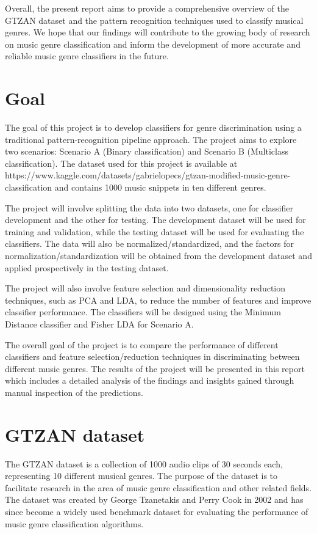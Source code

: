 \documentclass[12pt, a4paper]{article}
\begin{document}
Overall, the present report aims to provide a comprehensive overview of the GTZAN dataset and the pattern recognition techniques used to classify musical genres. We hope that our findings will contribute to the growing body of research on music genre classification and inform the development of more accurate and reliable music genre classifiers in the future.

\newpage
\section{Goal}

The goal of this project is to develop classifiers for genre discrimination using a traditional pattern-recognition pipeline approach. The project aims to explore two scenarios: Scenario A (Binary classification) and Scenario B (Multiclass classification). The dataset used for this project is available at https://www.kaggle.com/datasets/gabrielopecs/gtzan-modified-music-genre-classification and contains 1000 music snippets in ten different genres.

The project will involve splitting the data into two datasets, one for classifier development and the other for testing. The development dataset will be used for training and validation, while the testing dataset will be used for evaluating the classifiers. The data will also be normalized/standardized, and the factors for normalization/standardization will be obtained from the development dataset and applied prospectively in the testing dataset.

The project will also involve feature selection and dimensionality reduction techniques, such as PCA and LDA, to reduce the number of features and improve classifier performance. The classifiers will be designed using the Minimum Distance classifier and Fisher LDA for Scenario A.

The overall goal of the project is to compare the performance of different classifiers and feature selection/reduction techniques in discriminating between different music genres. The results of the project will be presented in this report which includes a detailed analysis of the findings and insights gained through manual inspection of the predictions.
\newpage

\section{GTZAN dataset}

The GTZAN dataset is a collection of 1000 audio clips of 30 seconds each, representing 10 different musical genres. The purpose of the dataset is to facilitate research in the area of music genre classification and other related fields. The dataset was created by George Tzanetakis and Perry Cook in 2002 and has since become a widely used benchmark dataset for evaluating the performance of music genre classification algorithms.
\end{document}
